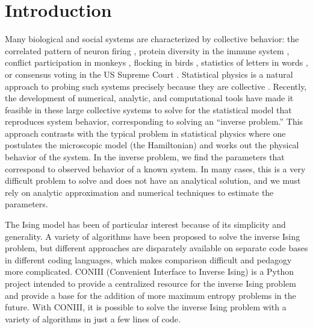 \documentclass[aps,prl,twocolumn,nofootinbib]{revtex4-1}
\begin{document}
\section{Introduction}
Many biological and social systems are characterized by collective behavior: the correlated pattern of neuron firing \cite{Schneidman:2006he}, protein diversity in the immune system \cite{XXX}, conflict participation in monkeys \cite{XXX}, flocking in birds \cite{Bialek:2012cs}, statistics of letters in words \cite{XXX}, or consensus voting in the US Supreme Court \cite{Lee:2015ev}. Statistical physics is a natural approach to probing such systems precisely because they are collective \cite{Castellano:2009ce}.
Recently, the development of numerical, analytic, and computational tools have made it feasible in these large collective systems to solve for the statistical model that reproduces system behavior, corresponding to solving an ``inverse problem.''
This approach contrasts with the typical problem in statistical physics where one postulates the microscopic model (the Hamiltonian) and works out the physical behavior of the system. In the inverse problem, we  find the parameters that correspond to observed behavior of a known system. In many cases, this is a very difficult problem to solve and does not have an analytical solution, and we must rely on analytic approximation and numerical techniques to estimate the parameters.

The Ising model has been of particular interest because of its simplicity and generality. A variety of algorithms have been proposed to solve the inverse Ising problem, but different approaches are disparately available on separate code bases in different coding languages, which makes comparison difficult and pedagogy more complicated.
CONIII (Convenient Interface to Inverse Ising) is a Python project intended to provide a centralized resource for the inverse Ising problem and provide a base for the addition of more maximum entropy problems in the future. With CONIII, it is possible to solve the inverse Ising problem with a variety of algorithms in just a few lines of code.
\end{document}
